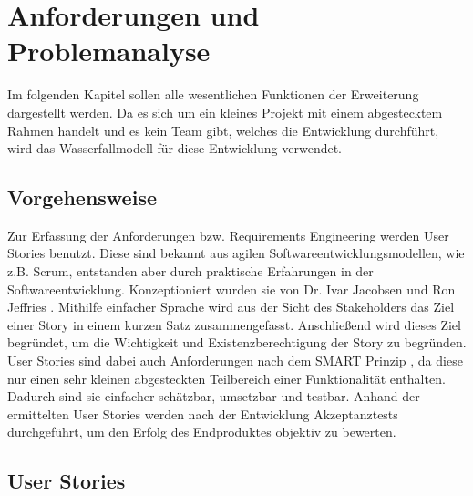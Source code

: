 \chapter{Anforderungen und Problemanalyse}
\label{ch:anforderungen}

Im folgenden Kapitel sollen alle wesentlichen Funktionen der Erweiterung dargestellt werden. Da es sich um ein kleines Projekt mit einem abgestecktem Rahmen handelt und es kein Team gibt, welches die Entwicklung durchführt, wird das Wasserfallmodell für diese Entwicklung verwendet.


\section{Vorgehensweise}

Zur Erfassung der Anforderungen bzw. Requirements Engineering werden User Stories benutzt. Diese sind bekannt aus agilen Softwareentwicklungsmodellen, wie z.B. Scrum, entstanden aber durch praktische Erfahrungen in der Softwareentwicklung. Konzeptioniert wurden sie von Dr. Ivar Jacobsen \cite{jacobsonUseCaseHubSoftware2016} und Ron Jeffries \cite{jeffriesEssentialXPCard}. Mithilfe einfacher Sprache wird aus der Sicht des Stakeholders das Ziel einer Story in einem kurzen Satz zusammengefasst. Anschließend wird dieses Ziel begründet, um die Wichtigkeit und Existenzberechtigung der Story zu begründen. User Stories sind dabei auch Anforderungen nach dem SMART Prinzip \cite{witteTestmanagementUndSoftwaretest2016}, da diese nur einen sehr kleinen abgesteckten Teilbereich einer Funktionalität enthalten. Dadurch sind sie einfacher schätzbar, umsetzbar und testbar.
Anhand der ermittelten User Stories werden nach der Entwicklung Akzeptanztests durchgeführt, um den Erfolg des Endproduktes objektiv zu bewerten.

\section{User Stories}

